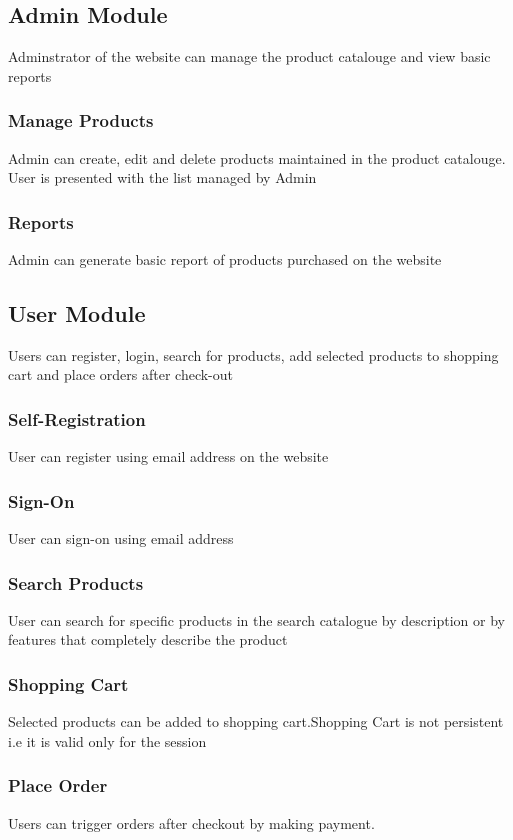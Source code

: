 \documentclass[hidelinks,a4paper,12pt]{article}
\begin{document}
\subsection{Admin Module}
Adminstrator of the website can manage the product catalouge and view basic reports

\subsubsection{Manage Products}
Admin can create, edit and delete products maintained in the product catalouge. User is presented with the list managed by Admin

\subsubsection{Reports}
Admin can generate basic report of products purchased on the website

\subsection{User Module}
Users can register, login, search for products, add selected products to shopping cart and place orders after check-out

\subsubsection{Self-Registration}
User can register using email address on the website

\subsubsection{Sign-On}
User can sign-on using email address

\subsubsection{Search Products}
User can search for specific products in the search catalogue by description or by features that completely describe the product

\subsubsection{Shopping Cart}
Selected products can be added to shopping cart.Shopping Cart is not persistent i.e it is valid only for the session

\subsubsection{Place Order}
Users can trigger orders after checkout by making payment.
\end{document}
